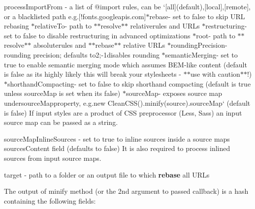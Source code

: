 \begin{DoxyItemize}
\item {\ttfamily process\+Import\+From} -\/ a list of {\ttfamily @import} rules, can be `\mbox{[}\textquotesingle{}all\textquotesingle{}\mbox{]}{\ttfamily (default),}\mbox{[}\textquotesingle{}local\textquotesingle{}\mbox{]}{\ttfamily ,}\mbox{[}\textquotesingle{}remote\textquotesingle{}\mbox{]}{\ttfamily , or a blacklisted path e.\+g.}\mbox{[}\textquotesingle{}!fonts.googleapis.\+com\textquotesingle{}\mbox{]}{\ttfamily  $\ast$}rebase{\ttfamily -\/ set to false to skip U\+RL rebasing $\ast$}relative\+To{\ttfamily -\/ path to $\ast$$\ast$resolve$\ast$$\ast$ relative}{\ttfamily rules and U\+R\+Ls $\ast$}restructuring{\ttfamily -\/ set to false to disable restructuring in advanced optimizations $\ast$}root{\ttfamily -\/ path to $\ast$$\ast$resolve$\ast$$\ast$ absolute}{\ttfamily rules and $\ast$$\ast$rebase$\ast$$\ast$ relative U\+R\+Ls $\ast$}rounding\+Precision{\ttfamily -\/ rounding precision; defaults to}2{\ttfamily ;}-\/1{\ttfamily disables rounding $\ast$}semantic\+Merging{\ttfamily -\/ set to true to enable semantic merging mode which assumes B\+E\+M-\/like content (default is false as it\textquotesingle{}s highly likely this will break your stylesheets -\/ $\ast$$\ast$use with caution$\ast$$\ast$!) $\ast$}shorthand\+Compacting{\ttfamily -\/ set to false to skip shorthand compacting (default is true unless source\+Map is set when it\textquotesingle{}s false) $\ast$}source\+Map{\ttfamily -\/ exposes source map under}source\+Map{\ttfamily property, e.\+g.}new Clean\+C\+S\+S().minify(source).source\+Map` (default is false) If input styles are a product of C\+SS preprocessor (Less, Sass) an input source map can be passed as a string.
\item {\ttfamily source\+Map\+Inline\+Sources} -\/ set to true to inline sources inside a source map\textquotesingle{}s {\ttfamily sources\+Content} field (defaults to false) It is also required to process inlined sources from input source maps.
\item {\ttfamily target} -\/ path to a folder or an output file to which {\bfseries rebase} all U\+R\+Ls
\end{DoxyItemize}

The output of {\ttfamily minify} method (or the 2nd argument to passed callback) is a hash containing the following fields\+:


